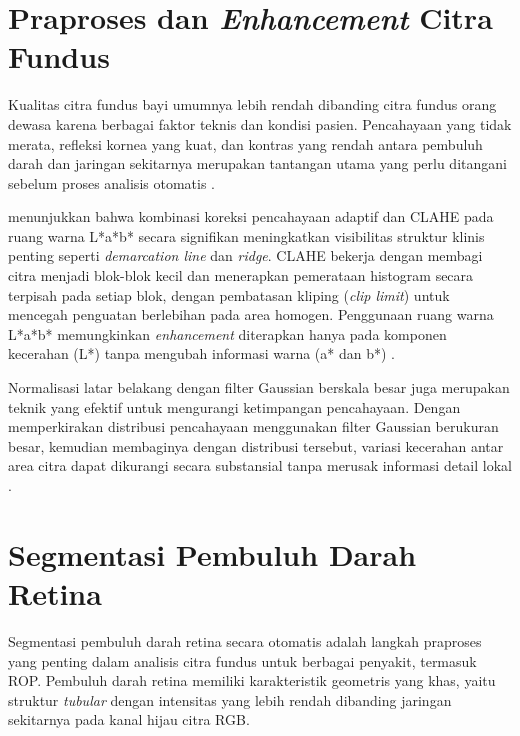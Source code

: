 \section{Praproses dan \textit{Enhancement} Citra Fundus}

Kualitas citra fundus bayi umumnya lebih rendah dibanding citra fundus orang dewasa karena
berbagai faktor teknis dan kondisi pasien. Pencahayaan yang tidak merata, refleksi kornea yang
kuat, dan kontras yang rendah antara pembuluh darah dan jaringan sekitarnya merupakan tantangan
utama yang perlu ditangani sebelum proses analisis otomatis \citep{Rahim2024}.

\citet{Rahim2024} menunjukkan bahwa kombinasi koreksi pencahayaan adaptif dan CLAHE pada ruang
warna L*a*b* secara signifikan meningkatkan visibilitas struktur klinis penting seperti
\textit{demarcation line} dan \textit{ridge}. CLAHE bekerja dengan membagi citra menjadi
blok-blok kecil dan menerapkan pemerataan histogram secara terpisah pada setiap blok, dengan
pembatasan kliping (\textit{clip limit}) untuk mencegah penguatan berlebihan pada area homogen.
Penggunaan ruang warna L*a*b* memungkinkan \textit{enhancement} diterapkan hanya pada komponen
kecerahan (L*) tanpa mengubah informasi warna (a* dan b*) \citep{Rahim2024}.

Normalisasi latar belakang dengan filter Gaussian berskala besar juga merupakan teknik yang
efektif untuk mengurangi ketimpangan pencahayaan. Dengan memperkirakan distribusi pencahayaan
menggunakan filter Gaussian berukuran besar, kemudian membaginya dengan distribusi tersebut,
variasi kecerahan antar area citra dapat dikurangi secara substansial tanpa merusak informasi
detail lokal \citep{Almeida2024}.

\section{Segmentasi Pembuluh Darah Retina}

Segmentasi pembuluh darah retina secara otomatis adalah langkah praproses yang penting dalam
analisis citra fundus untuk berbagai penyakit, termasuk ROP. Pembuluh darah retina memiliki
karakteristik geometris yang khas, yaitu struktur \textit{tubular} dengan intensitas yang lebih
rendah dibanding jaringan sekitarnya pada kanal hijau citra RGB.


